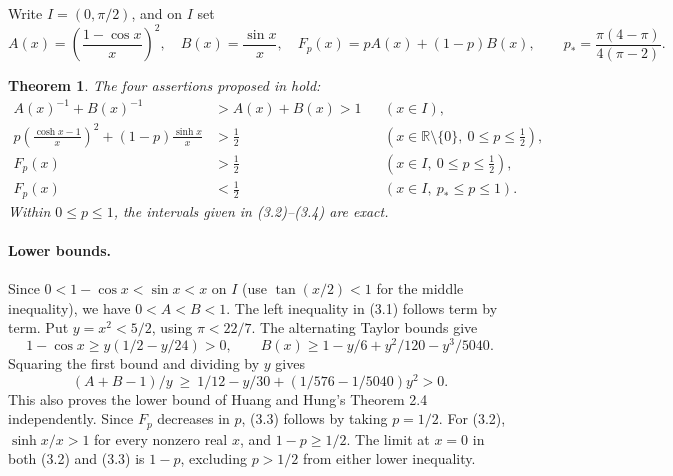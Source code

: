 \documentclass[11pt,a4paper]{article}
\numberwithin{equation}{section}
\newtheorem{theorem}{Theorem}[section]
\theoremstyle{definition}
\theoremstyle{remark}
\begin{document}
Write $I=(0,\pi/2)$, and on $I$ set
\[
 A(x)=\left(\frac{1-\cos x}{x}\right)^2,\quad
 B(x)=\frac{\sin x}{x},\quad F_p(x)=pA(x)+(1-p)B(x),\qquad
 p_* =\frac{\pi(4-\pi)}{4(\pi-2)}.
\]
\begin{theorem}
The four assertions proposed in \cite[Sec.~3, (3.1)--(3.4)]{r26reiwa:HH} hold:
\begin{align}
 A(x)^{-1}+B(x)^{-1}&>A(x)+B(x)>1 &&(x\in I),\tag{3.1}\\
 p\left(\frac{\cosh x-1}{x}\right)^2+(1-p)\frac{\sinh x}{x}
 &>\tfrac12 &&(x\in\mathbb R\setminus\{0\},\ 0\le p\le\tfrac12),\tag{3.2}\\
 F_p(x)&>\tfrac12 &&(x\in I,\ 0\le p\le\tfrac12),\tag{3.3}\\
 F_p(x)&<\tfrac12 &&(x\in I,\ p_*\le p\le1).\tag{3.4}
\end{align}
Within $0\le p\le 1$, the intervals given in (3.2)--(3.4) are exact.
\end{theorem}

\paragraph{Lower bounds.}
Since $0<1-\cos x<\sin x<x$ on $I$ (use $\tan(x/2)<1$ for the middle inequality), we have $0<A<B<1$. The left inequality in (3.1) follows term by term. Put $y=x^2<5/2$, using $\pi<22/7$. The alternating Taylor bounds give
\[
 1-\cos x\ge y(1/2-y/24)>0,\qquad
 B(x)\ge 1-y/6+y^2/120-y^3/5040.
\]
Squaring the first bound and dividing by $y$ gives
\[
 (A+B-1)/y\ \ge\ 1/12-y/30+(1/576-1/5040)y^2>0.
\]
This also proves the lower bound of Huang and Hung's Theorem 2.4 independently. Since $F_p$ decreases in $p$, (3.3) follows by taking $p=1/2$. For (3.2), $\sinh x/x>1$ for every nonzero real $x$, and $1-p\ge1/2$. The limit at $x=0$ in both (3.2) and (3.3) is $1-p$, excluding $p>1/2$ from either lower inequality.
\end{document}
